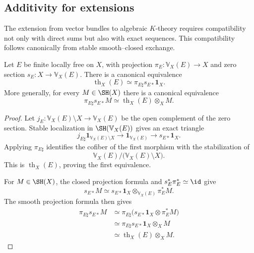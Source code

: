 \subsection{Additivity for extensions}

The extension from vector bundles to algebraic $K$-theory requires compatibility not only with direct
sums but also with exact sequences.  This compatibility follows canonically from stable
smooth--closed exchange.

\begin{proposition}
\label{prop:thom-transformation}
Let $E$ be finite locally free on $X$, with projection
$\pi_E:\mathbb V_X(E)\to X$ and zero section
$s_E:X\to\mathbb V_X(E)$.  There is a canonical equivalence
\[
    \operatorname{th}_X(E)
    \simeq
    \pi_{E\sharp}s_{E*}\mathbf 1_X.
\]
More generally, for every $M\in\SH(X)$ there is a canonical equivalence
\[
    \pi_{E\sharp}s_{E*}M
    \simeq
    \operatorname{th}_X(E)\otimes_XM.
\]
\end{proposition}

\begin{proof}
Let $j_E:\mathbb V_X(E)\setminus X\to\mathbb V_X(E)$ be the open complement of the zero section.
Stable localization in $\SH(\mathbb V_X(E))$ gives an exact triangle
\[
    j_{E\sharp}\mathbf 1_{\mathbb V_X(E)\setminus X}
    \longrightarrow
    \mathbf 1_{\mathbb V_X(E)}
    \longrightarrow
    s_{E*}\mathbf 1_X.
\]
Applying $\pi_{E\sharp}$ identifies the cofiber of the first morphism with the stabilization of
\[
    \mathbb V_X(E)/\bigl(\mathbb V_X(E)\setminus X\bigr).
\]
This is $\operatorname{th}_X(E)$, proving the first equivalence.

For $M\in\SH(X)$, the closed projection formula and $s_E^*\pi_E^*\simeq\id$ give
\[
    s_{E*}M
    \simeq
    s_{E*}\mathbf 1_X\otimes_{\mathbb V_X(E)}\pi_E^*M.
\]
The smooth projection formula then gives
\[
\begin{aligned}
    \pi_{E\sharp}s_{E*}M
    &\simeq
    \pi_{E\sharp}\bigl(
      s_{E*}\mathbf 1_X\otimes\pi_E^*M
    \bigr) \\
    &\simeq
    \pi_{E\sharp}s_{E*}\mathbf 1_X\otimes_XM \\
    &\simeq
    \operatorname{th}_X(E)\otimes_XM.
\end{aligned}
\]
\end{proof}


